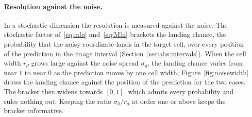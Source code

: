 \documentclass[11pt,a4paper]{article}
\theoremstyle{plain}
\theoremstyle{remark}
\begin{document}
	\paragraph{Resolution against the noise.}
	In a stochastic dimension the resolution is measured against the
	noise. The stochastic factor of~\eqref{eq:mlo} and~\eqref{eq:Mhi}
	brackets the landing chance, the probability that the noisy
	coordinate lands in the target cell, over every position of the
	prediction in the image interval
	(Section~\ref{sec:abs:intervals}). When the cell width $r_d$ grows
	large against the noise spread $\sigma_d$, the landing chance
	varies from near $1$ to near $0$ as the prediction moves by one
	cell width; Figure~\ref{fig:noisewidth} draws the landing chance
	against the position of the prediction for the two cases. The
	bracket then widens towards $[0,1]$, which admits every
	probability and rules nothing out. Keeping the ratio
	$\sigma_d / r_d$ at order one or above keeps the bracket
	informative.
\end{document}

